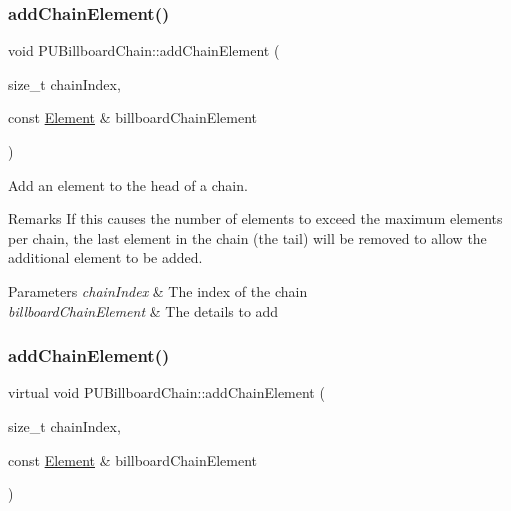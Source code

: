\subsubsection{\texorpdfstring{add\+Chain\+Element()}{addChainElement()}\hspace{0.1cm}{\footnotesize\ttfamily [1/2]}}
{\footnotesize\ttfamily void P\+U\+Billboard\+Chain\+::add\+Chain\+Element (\begin{DoxyParamCaption}\item[{size\+\_\+t}]{chain\+Index,  }\item[{const \hyperlink{classPUBillboardChain_1_1Element}{Element} \&}]{billboard\+Chain\+Element }\end{DoxyParamCaption})\hspace{0.3cm}{\ttfamily [virtual]}}

Add an element to the \textquotesingle{}head\textquotesingle{} of a chain. \begin{DoxyRemark}{Remarks}
If this causes the number of elements to exceed the maximum elements per chain, the last element in the chain (the \textquotesingle{}tail\textquotesingle{}) will be removed to allow the additional element to be added. 
\end{DoxyRemark}

\begin{DoxyParams}{Parameters}
{\em chain\+Index} & The index of the chain \\
\hline
{\em billboard\+Chain\+Element} & The details to add \\
\hline
\end{DoxyParams}
\mbox{\label{classPUBillboardChain_a38365d5ca4c157b09280dc3a61ab9b63}} 
\subsubsection{\texorpdfstring{add\+Chain\+Element()}{addChainElement()}\hspace{0.1cm}{\footnotesize\ttfamily [2/2]}}
{\footnotesize\ttfamily virtual void P\+U\+Billboard\+Chain\+::add\+Chain\+Element (\begin{DoxyParamCaption}\item[{size\+\_\+t}]{chain\+Index,  }\item[{const \hyperlink{classPUBillboardChain_1_1Element}{Element} \&}]{billboard\+Chain\+Element }\end{DoxyParamCaption})\hspace{0.3cm}{\ttfamily [virtual]}}

